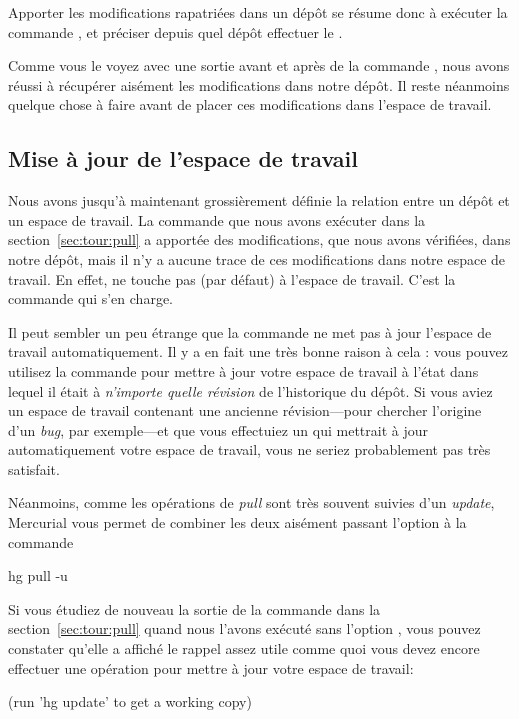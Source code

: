 Apporter les modifications rapatriées dans un dépôt se résume donc
à exécuter la commande , et préciser depuis quel dépôt 
effectuer le .

Comme vous le voyez avec une sortie avant et après de la commande
, nous avons réussi à récupérer aisément les modifications
dans notre dépôt. Il reste néanmoins quelque chose à faire avant de
placer ces modifications dans l'espace de travail.

\subsection{Mise à jour de l'espace de travail}

Nous avons jusqu'à maintenant grossièrement définie la relation 
entre un dépôt et un espace de travail. La commande  que
nous avons exécuter dans la section~\ref{sec:tour:pull} a apportée
des modifications, que nous avons vérifiées, dans notre dépôt, mais
il n'y a aucune trace de ces modifications dans notre espace de travail.
En effet,  ne touche pas (par défaut) à l'espace de 
travail. C'est la commande  qui s'en charge.

Il peut sembler un peu étrange que la commande  ne met
pas à jour l'espace de travail automatiquement. Il y a en fait une
très bonne raison à cela : vous pouvez utilisez la commande 
 pour mettre à jour votre espace de travail à l'état
dans lequel il était à \emph{n'importe quelle révision} de l'historique
du dépôt. Si vous aviez un espace de travail contenant une ancienne
révision---pour chercher l'origine d'un \textit{bug}, par exemple---et
que vous effectuiez un  qui mettrait à jour automatiquement
votre espace de travail, vous ne seriez probablement pas très satisfait.

Néanmoins, comme les opérations de \textit{pull} sont très souvent
suivies d'un \textit{update}, Mercurial vous permet de combiner les
deux aisément passant l'option  à la commande 
\begin{codesample2}
  hg pull -u
\end{codesample2}

Si vous étudiez de nouveau la sortie de la commande  dans
la section~\ref{sec:tour:pull} quand nous l'avons exécuté sans l'option
, vous pouvez constater qu'elle a affiché le rappel assez
utile comme quoi vous devez encore effectuer une opération pour mettre à jour
votre espace de travail:
\begin{codesample2}
  (run 'hg update' to get a working copy)
\end{codesample2}

